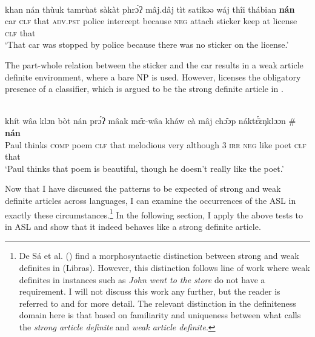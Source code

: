 \documentclass[output=paper,
modfonts
]{langscibook}
\begin{document}
\begin{exe}
\ex\label{ex:irani:18} \\  {khan} {n{\'a}n} {th{\`u}uk} {tamr{\`u}at} {s{\`a}k{\`a}t} {phr{\'ɔ}ʔ} {m{\^a}j.d{\^a}j} {t{\`i}t} {satikəə} {w{\'a}j} {th{\^i}i} {th{\'a}bian}  {\textbf{n{\'a}n}}\cp\\
car \textsc{clf} that \textsc{adv}.\textsc{pst} police intercept because \textsc{neg} attach sticker keep at license \phantom{\#\op}\textsc{clf} that\\
\trans `That car was stopped by police because there was no sticker on the license.' 
\end{exe} 

The part-whole relation between the sticker and the car results in a weak article definite environment, where a bare NP is used. However,  licenses the obligatory presence of a classifier, which is argued to be the strong definite article in  \citep{Jenks2015}. 

\begin{exe} 
\ex {} \\  {kh{\'i}t} {w{\^a}a} {klɔn} {b{\`o}t} {n{\'a}n} {pr{\'ɔ}ʔ} {m{\^a}ak} {m{\^ɛ}{ɛ}-w{\^a}a} {kh{\'a}w} {c{\`a}} {m{\^a}j} {ch{\^ɔ}{ɔ}p} {n{\'a}kt{\'{\={ɛ}}}{ɛ}ŋklɔɔn} \# {\textbf{n{\'a}n}}\cp\\
Paul thinks \textsc{comp} poem \textsc{clf} that melodious very although 3 \textsc{irr} \textsc{neg} like poet \phantom{\#\op}\textsc{clf} that\\
\trans `Paul thinks that poem is beautiful, though he doesn’t really like the poet.'
\end{exe}

Now that I have discussed the patterns to be expected of strong and weak definite articles across languages, I can examine the occurrences of the ASL  in exactly these circumstances.\footnote{De Sá et al. (\citeyear{SaEtAlii2012}) find a morphosyntactic distinction between strong and weak definites in  (Libras). However, this distinction follows  line of work where weak definites in instances such as \textit{John went to the store} do not have a  requirement. I will not discuss this work any further, but the reader is referred to \citet{CarlsonSussman2005} and \citet{CarlsonEtAlii2006} for more detail. The relevant distinction in the definiteness domain here is that based on familiarity and uniqueness between what \citet{Schwarz2009} calls the \textit{strong article definite} and \textit{weak article definite}.} In the following section, I apply the above tests to  in ASL and show that it indeed behaves like a strong definite article.
\end{document}
